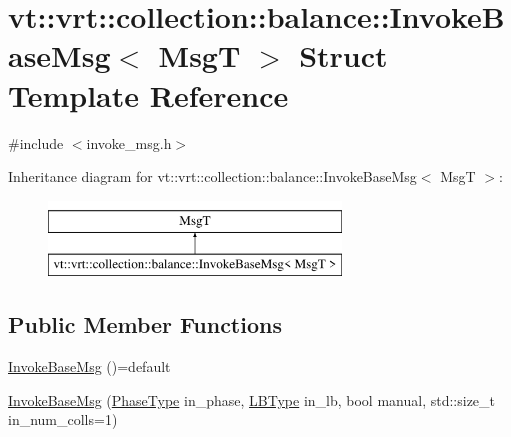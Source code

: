 \hypertarget{structvt_1_1vrt_1_1collection_1_1balance_1_1_invoke_base_msg}{}\section{vt\+:\+:vrt\+:\+:collection\+:\+:balance\+:\+:Invoke\+Base\+Msg$<$ MsgT $>$ Struct Template Reference}
\label{structvt_1_1vrt_1_1collection_1_1balance_1_1_invoke_base_msg}


{\ttfamily \#include $<$invoke\+\_\+msg.\+h$>$}

Inheritance diagram for vt\+:\+:vrt\+:\+:collection\+:\+:balance\+:\+:Invoke\+Base\+Msg$<$ MsgT $>$\+:\begin{figure}[H]
\begin{center}
\leavevmode
\includegraphics[height=2.000000cm]{structvt_1_1vrt_1_1collection_1_1balance_1_1_invoke_base_msg}
\end{center}
\end{figure}
\subsection*{Public Member Functions}
\begin{DoxyCompactItemize}
\item 
\hyperlink{structvt_1_1vrt_1_1collection_1_1balance_1_1_invoke_base_msg_acfc1f9a1ca07cce5d838a8847c3a9709}{Invoke\+Base\+Msg} ()=default
\item 
\hyperlink{structvt_1_1vrt_1_1collection_1_1balance_1_1_invoke_base_msg_a5519d39a1c2ea8c15dc9d03e30687c35}{Invoke\+Base\+Msg} (\hyperlink{namespacevt_a46ce6733d5cdbd735d561b7b4029f6d7}{Phase\+Type} in\+\_\+phase, \hyperlink{namespacevt_1_1vrt_1_1collection_1_1balance_ac4f99693509affcc67db182d4aad9b5c}{L\+B\+Type} in\+\_\+lb, bool manual, std\+::size\+\_\+t in\+\_\+num\+\_\+colls=1)
\end{DoxyCompactItemize}
